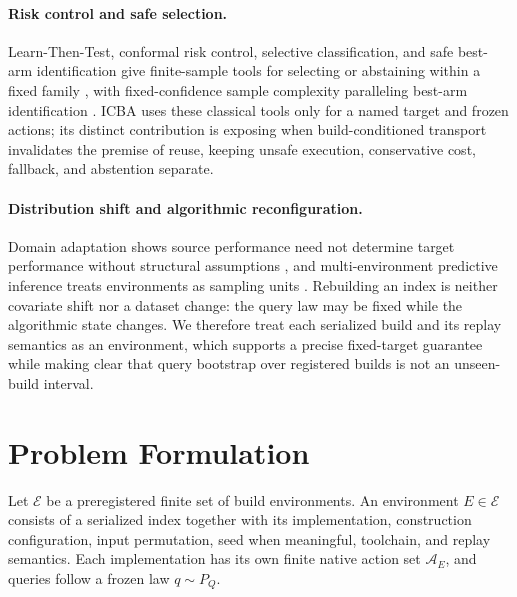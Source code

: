 \documentclass{article}
\newcommand{\Acal}{\mathcal{A}}
\newcommand{\Ecal}{\mathcal{E}}
\begin{document}
\paragraph{Risk control and safe selection.}
Learn-Then-Test, conformal risk control, selective classification, and safe best-arm identification give
finite-sample tools for selecting or abstaining within a fixed family
\citep{angelopoulos2025ltt,bates2021rcps,angelopoulos2024crc,elyaniv2010selective,wang2022safebai}, with
fixed-confidence sample complexity paralleling best-arm identification \citep{garivier2016bai}. ICBA uses
these classical tools only for a named target and frozen actions; its distinct contribution is exposing
when build-conditioned transport invalidates the premise of reuse, keeping unsafe execution, conservative
cost, fallback, and abstention separate.

\paragraph{Distribution shift and algorithmic reconfiguration.}
Domain adaptation shows source performance need not determine target performance without structural
assumptions \citep{bendavid2010theory,johansson2019support}, and multi-environment predictive inference
treats environments as sampling units \citep{duchi2025multienv}. Rebuilding an index is neither covariate
shift nor a dataset change: the query law may be fixed while the algorithmic state changes. We therefore
treat each serialized build and its replay semantics as an environment, which supports a precise
fixed-target guarantee while making clear that query bootstrap over registered builds is not an
unseen-build interval.

\section{Problem Formulation}
\label{sec:formulation}

Let $\Ecal$ be a preregistered finite set of build environments. An environment $E\in\Ecal$ consists of a
serialized index together with its implementation, construction configuration, input permutation, seed when
meaningful, toolchain, and replay semantics. Each implementation has its own finite native action set
$\Acal_E$, and queries follow a frozen law $q\sim P_Q$.
\end{document}

